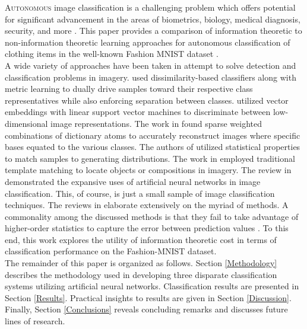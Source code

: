 \documentclass[conference]{IEEEtran}
\begin{document}
\lettrine{A}{utonomous} image classification is a challenging problem which offers potential for significant advancement in the areas of biometrics, biology, medical diagnosis, security, and more \cite{Prasad2015Review,Lu2007Review}.  This paper provides a comparison of information theoretic  to non-information theoretic learning approaches for autonomous classification of  clothing items in the well-known Fashion MNIST dataset \cite{Xiao2017FashionMNIST}.  \\
\indent A wide variety of approaches have been taken in attempt to solve detection and classification problems in imagery.  \cite{Mensink2013KNN} used dissimilarity-based classifiers along with metric learning to dually drive samples toward their respective class representatives while also enforcing separation between classes.  \cite{Sanchez2011svm,Lin2011svm} utilized vector embeddings with linear support vector machines to discriminate between low-dimensional image representations.  The work in \cite{Shao2019DictionaryLearning} found sparse weighted combinations of dictionary atoms to accurately reconstruct images where specific bases equated to the various  classes.  The authors of \cite{Timofte2013NaiveBayes} utilized statistical properties to match samples to generating distributions.  The work in \cite{Swaroop2016TemplateMatching} employed traditional template matching to locate objects or compositions in imagery.  The review in \cite{Driss2017MLPandCNN} demonstrated the expansive uses of artificial neural networks in image classification.  This, of course, is just a small sample of image classification techniques.  The reviews in \cite{Prasad2015Review,Lu2007Review} elaborate extensively on the myriad of methods.  A commonality among the discussed methods is that they fail to take advantage of higher-order statistics to capture the error between prediction values \cite{Principe2010ITL}.  To this end, this work explores the utility of information theoretic cost in terms of classification performance on the Fashion-MNIST dataset.\\
\indent The remainder of this paper is organized as follows.  Section \ref{Methodology} describes the methodology used in developing three disparate classification systems utilizing artificial neural networks.  Classification results are presented in Section \ref{Results}.  Practical insights to results are given in Section \ref{Discussion}.  Finally, Section \ref{Conclusions} reveals concluding remarks and discusses future lines of research.

\vspace{-0.3cm}
\end{document}
